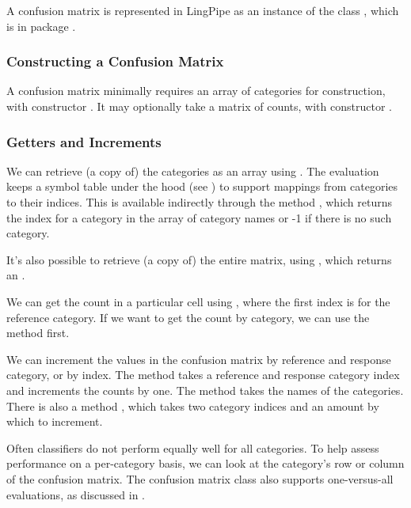 A confusion matrix is represented in LingPipe as an instance of the
class , which is in package
.  

\subsubsection{Constructing a Confusion Matrix}

A confusion matrix minimally requires an array of categories for
construction, with constructor .  It
may optionally take a matrix of counts, with constructor
.

\subsubsection{Getters and Increments}

We can retrieve (a copy of) the categories as an array using
.  The evaluation keeps a symbol table under the
hood (see ) to support mappings from categories
to their indices.  This is available indirectly through the method
, which returns the index for a category in the
array of category names or -1 if there is no such category.

It's also possible to retrieve (a copy of) the entire matrix, using
, which returns an .  

We can get the count in a particular cell using ,
where the first index is for the reference category.  If we want to
get the count by category, we can use the  method
first.

We can increment the values in the confusion matrix by reference and
response category, or by index.  The method 
takes a reference and response category index and increments the
counts by one.  The method  takes
the names of the categories.  There is also a method
, which takes two category indices
and an amount by which to increment.

Often classifiers do not perform equally well for all categories.  To
help assess performance on a per-category basis, we can look at the
category's row or column of the confusion matrix.  The confusion
matrix class also supports one-versus-all evaluations, as
discussed in .


